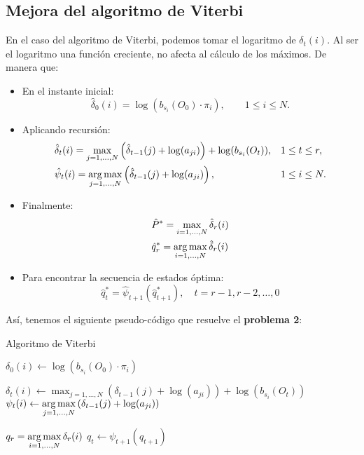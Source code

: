 \subsection{Mejora del algoritmo de Viterbi}
En el caso del algoritmo de Viterbi, podemos tomar el logaritmo de $\delta_t(i)$. Al ser el logaritmo una función creciente, no afecta al cálculo de los máximos. De manera que:
\begin{itemize}
    \item En el instante inicial:
    \begin{equation*}
        \hat{\delta}_0(i)=\log(b_{s_i}(O_0)\cdot\pi_i), \qquad 1\leq i\leq N.
    \end{equation*}
    \item Aplicando recursión:
    \begin{align*}
        &\hat{\delta}_t(i)=\max_{j=1,\dots,N}\left( \hat{\delta}_{t-1}(j)+\log(a_{ji}) \right)+\log(b_{s_i}(O_t)), && 1\leq t\leq r, \\
        &\hat{\psi}_t(i)=\operatorname*{\arg\max}_{j=1,\dots,N}\left(\hat{\delta}_{t-1}(j)+\log(a_{ji})\right),  &&  1\leq i\leq N.
    \end{align*}
    \item Finalmente:
    \begin{align*}
        & \hat{P}^*=\max_{i=1,\dots,N} \hat{\delta}_r(i)\\
        & \hat{q}_r^*=\operatorname*{\arg\max}_{i=1,\dots,N} \hat{\delta}_r(i)
    \end{align*} 
    \item Para encontrar la secuencia de estados óptima:
    \[\hat{q}_t^*=\hat{\psi}_{t+1}(\hat{q}_{t+1}^*), \quad t=r-1,r-2,\dots,0\]
\end{itemize}
Así, tenemos el siguiente pseudo-código que resuelve el \textbf{problema 2}: \medskip
\begin{breakablealgorithm}
\caption{Algoritmo de Viterbi} \label{PseudocódigoViterbi}
\begin{algorithmic}[1]


        \State $\delta_0(i)\gets \log(b_{s_i}(O_0)\cdot\pi_i)$
    \EndFor \State
    
            \State $\delta_t(i)\gets \displaystyle\max_{j=1,\dots,N}\left( \delta_{t-1}(j)+\log(a_{ji}) \right)+\log(b_{s_i}(O_t))$
            \State $\psi_t(i) \gets \displaystyle\operatorname*{\arg\max}_{j=1,\dots,N}\left(\delta_{t-1}(j)+\log(a_{ji})\right)$
         \EndFor
    \EndFor
    
    \State $q_r=\displaystyle\operatorname*{\arg\max}_{i=1,\dots,N} \delta_r(i)$
        \State $q_t\gets\psi_{t+1}(q_{t+1})$
    \EndFor
    
\end{algorithmic}
\end{breakablealgorithm}